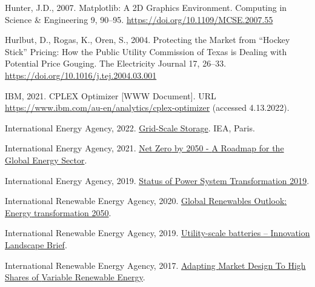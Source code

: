 \documentclass[12pt,a4paper,]{report}
\newlength{\cslhangindent}
\newenvironment{CSLReferences}[2] %
 {%
  \setlength{\parindent}{0pt}
  \ifodd #1 \everypar{\setlength{\hangindent}{\cslhangindent}}\ignorespaces\fi
  \ifnum #2 > 0
  \setlength{\parskip}{#2\baselineskip}
  \fi
 }%
 {}
\begin{document}
\begin{CSLReferences}{1}{0}
\leavevmode{}%
Hunter, J.D., 2007. Matplotlib: {A 2D Graphics Environment}. Computing
in Science \& Engineering 9, 90--95.
\url{https://doi.org/10.1109/MCSE.2007.55}

\leavevmode{}%
Hurlbut, D., Rogas, K., Oren, S., 2004. Protecting the {Market} from
{``{Hockey Stick}''} {Pricing}: {How} the {Public Utility Commission} of
{Texas} is {Dealing} with {Potential Price Gouging}. The Electricity
Journal 17, 26--33. \url{https://doi.org/10.1016/j.tej.2004.03.001}

\leavevmode{}%
IBM, 2021. {CPLEX Optimizer} {[}WWW Document{]}. URL
\url{https://www.ibm.com/au-en/analytics/cplex-optimizer} (accessed
4.13.2022).

\leavevmode{}%
International Energy Agency, 2022.
\href{https://www.iea.org/fuels-and-technologies/energy-storage}{Grid-{Scale
Storage}}. IEA, Paris.

\leavevmode{}%
International Energy Agency, 2021.
\href{https://iea.blob.core.windows.net/assets/deebef5d-0c34-4539-9d0c-10b13d840027/NetZeroby2050-ARoadmapfortheGlobalEnergySector_CORR.pdf}{Net
{Zero} by 2050 - {A Roadmap} for the {Global Energy Sector}}.

\leavevmode{}%
International Energy Agency, 2019.
\href{https://iea.blob.core.windows.net/assets/00dd2818-65f1-426c-8756-9cc0409d89a8/Status_of_Power_System_Transformation_2019.pdf}{Status
of {Power System Transformation} 2019}.

\leavevmode{}%
International Renewable Energy Agency, 2020.
\href{https://www.irena.org/publications/2020/Apr/Global-Renewables-Outlook-2020}{Global
{Renewables Outlook}: {Energy} transformation 2050}.

\leavevmode{}%
International Renewable Energy Agency, 2019.
\href{https://www.irena.org/publications/2019/Sep/Utility-scale-batteries}{Utility-scale
batteries -- {Innovation Landscape Brief}}.

\leavevmode{}%
International Renewable Energy Agency, 2017.
\href{http://www.irena.org/publications/2017/May/Adapting-Market-Design-to-High-Shares-of-Variable-Renewable-Energy}{Adapting
{Market Design To High Shares} of {Variable Renewable Energy}}.


\end{CSLReferences}
\end{document}
